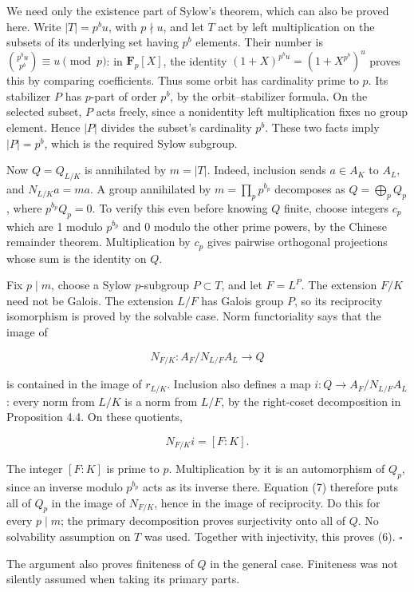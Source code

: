 \documentclass[11pt,a4paper]{article}
\begin{document}
We need only the existence part of Sylow's theorem, which can also be
proved here. Write \(|T|=p^b u\), with \(p\nmid u\), and let \(T\) act
by left multiplication on the subsets of its underlying set having
\(p^b\) elements. Their number is \(\binom{p^b u}{p^b}\equiv u\pmod p\):
in \(\mathbf F_p[X]\), the identity \((1+X)^{p^b u}=(1+X^{p^b})^u\)
proves this by comparing coefficients. Thus some orbit has cardinality
prime to \(p\). Its stabilizer \(P\) has \(p\)-part of order \(p^b\), by
the orbit--stabilizer formula. On the selected subset, \(P\) acts
freely, since a nonidentity left multiplication fixes no group element.
Hence \(|P|\) divides the subset's cardinality \(p^b\). These two facts
imply \(|P|=p^b\), which is the required Sylow subgroup.

Now \(Q=Q_{L/K}\) is annihilated by \(m=|T|\). Indeed, inclusion sends
\(a\in A_K\) to \(A_L\), and \(N_{L/K}a=ma\). A group annihilated by
\(m=\prod_p p^{b_p}\) decomposes as \(Q=\bigoplus_p Q_p\), where
\(p^{b_p}Q_p=0\). To verify this even before knowing \(Q\) finite,
choose integers \(c_p\) which are 1 modulo \(p^{b_p}\) and 0 modulo the
other prime powers, by the Chinese remainder theorem. Multiplication by
\(c_p\) gives pairwise orthogonal projections whose sum is the identity
on \(Q\).

Fix \(p\mid m\), choose a Sylow \(p\)-subgroup \(P\subset T\), and let
\(F=L^P\). The extension \(F/K\) need not be Galois. The extension
\(L/F\) has Galois group \(P\), so its reciprocity isomorphism is proved
by the solvable case. Norm functoriality says that the image of

\[
N_{F/K}:A_F/N_{L/F}A_L\longrightarrow Q
\]

is contained in the image of \(r_{L/K}\). Inclusion also defines a map
\(i:Q\to A_F/N_{L/F}A_L\): every norm from \(L/K\) is a norm from
\(L/F\), by the right-coset decomposition in Proposition 4.4. On these
quotients,

\[
N_{F/K}i=[F:K].
\tag{7}
\]

The integer \([F:K]\) is prime to \(p\). Multiplication by it is an
automorphism of \(Q_p\), since an inverse modulo \(p^{b_p}\) acts as its
inverse there. Equation (7) therefore puts all of \(Q_p\) in the image
of \(N_{F/K}\), hence in the image of reciprocity. Do this for every
\(p\mid m\); the primary decomposition proves surjectivity onto all of
\(Q\). No solvability assumption on \(T\) was used. Together with
injectivity, this proves (6). \(\square\)

The argument also proves finiteness of \(Q\) in the general case.
Finiteness was not silently assumed when taking its primary parts.
\end{document}
